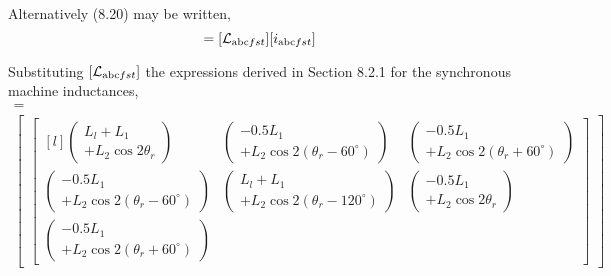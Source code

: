 \documentclass[a4paper,numbers=noenddot,12pt]{scrbook}
\begin{document}
Alternatively (8.20) may be written,
\begin{equation}
    [\varPsi_{\textup{abc}fst}] = [\mathcal{L}_{\textup{abc}fst}] [i_{\textup{abc}fst}]
    \label{eq:Eq8.21}
\end{equation}

Substituting $[\mathcal{L}_{\textup{abc}fst}]$ the expressions derived in Section 8.2.1 for the synchronous machine inductances,\\ \vfill \pagebreak[4]
\begin{multline}
    [\mathcal{L}_{\textup{abc}fst}] = \\ 
    \begin{bmatrix}
        \begin{bmatrix*}[l]
            \begin{pmatrix}
                L_l + L_1 \\ + L_2 \cos 2\theta_r 
            \end{pmatrix}
            & 
            \begin{pmatrix}
                -0.5 L_1 \\ + L_2 \cos 2(\theta_r - 60^{\circ})
            \end{pmatrix}
            & 
            \begin{pmatrix}
                -0.5 L_1 \\ + L_2 \cos 2(\theta_r + 60^{\circ})
            \end{pmatrix}
            \\
            \begin{pmatrix}
                - 0.5 L_1 \\ + L_2 \cos 2(\theta_r -60^{\circ}) 
            \end{pmatrix}
            &
            \begin{pmatrix}
                L_l + L_1 \\ + L_2 \cos 2(\theta_r - 120^{\circ})
            \end{pmatrix}
            &
            \begin{pmatrix}
                -0.5 L_1 \\ + L_2 \cos 2\theta_r
            \end{pmatrix}
            \\
            \begin{pmatrix}
                - 0.5 L_1 \\ + L_2 \cos 2(\theta_r + 60^{\circ}) 

\end{pmatrix}
\end{bmatrix*}
\end{bmatrix}
\end{multline}
\end{document}
